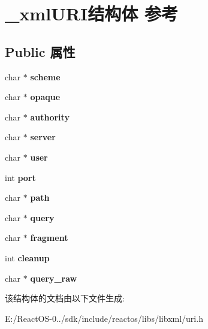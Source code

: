 \hypertarget{struct__xml_u_r_i}{}\section{\+\_\+xml\+U\+R\+I结构体 参考}
\label{struct__xml_u_r_i}
\subsection*{Public 属性}
\begin{DoxyCompactItemize}
\item 
\mbox{\label{struct__xml_u_r_i_a897cb3959ee230d9e647ec2443440024}} 
char $\ast$ {\bfseries scheme}
\item 
\mbox{\label{struct__xml_u_r_i_a40922d0937ac65c01ab443b85d7e0dd4}} 
char $\ast$ {\bfseries opaque}
\item 
\mbox{\label{struct__xml_u_r_i_a0258d553bc7e5732559e085c229674b5}} 
char $\ast$ {\bfseries authority}
\item 
\mbox{\label{struct__xml_u_r_i_a045a61b724d4d5d9c2c4b3c67e4bd120}} 
char $\ast$ {\bfseries server}
\item 
\mbox{\label{struct__xml_u_r_i_a7179d65bb0a6e8b36562e562b7eb6c4a}} 
char $\ast$ {\bfseries user}
\item 
\mbox{\label{struct__xml_u_r_i_a8460fd17316181c550e4f5b04e212eba}} 
int {\bfseries port}
\item 
\mbox{\label{struct__xml_u_r_i_a824d1521bda42a7d301a7a9c57484dc5}} 
char $\ast$ {\bfseries path}
\item 
\mbox{\label{struct__xml_u_r_i_ad6bacae3f53944b3224f8b8ae22a7126}} 
char $\ast$ {\bfseries query}
\item 
\mbox{\label{struct__xml_u_r_i_ae291e87e8f3bae519660a4087efeaf39}} 
char $\ast$ {\bfseries fragment}
\item 
\mbox{\label{struct__xml_u_r_i_a88f7bca5886e16c467eb1e1d4e729059}} 
int {\bfseries cleanup}
\item 
\mbox{\label{struct__xml_u_r_i_a614f1c8a9b677319d57568bcd2253ce8}} 
char $\ast$ {\bfseries query\+\_\+raw}
\end{DoxyCompactItemize}


该结构体的文档由以下文件生成\+:\begin{DoxyCompactItemize}
\item 
E\+:/\+React\+O\+S-\/0../sdk/include/reactos/libs/libxml/uri.\+h\end{DoxyCompactItemize}
